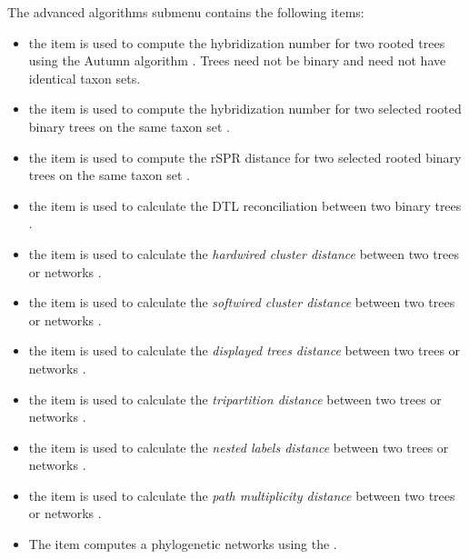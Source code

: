 \documentclass[11pt]{article}
\begin{document}
{\small
The advanced algorithms submenu contains the following items:
\begin{itemize}
\item the  item is used to compute the {hybridization number} for two rooted trees using the Autumn algorithm \cite{HusonLinz2012}. Trees need not be binary and need not have identical taxon
sets.
\item the  item is used to compute the {hybridization number} for two selected rooted binary trees on the same taxon set \cite{Albrecht2012}.
\item the  item  is used to compute the {rSPR distance} for two selected rooted binary trees on the same taxon set \cite{whiddenWABI}.
\item the  item  is used to calculate the {DTL reconciliation} between two binary trees \cite{Doyon10}.
\item the  item  is used to calculate the \emph{hardwired cluster distance} between two trees or networks \cite{PhylogeneticNetworks2010}.
\item the  item  is used to calculate the \emph{softwired cluster distance} between two trees or networks  \cite{PhylogeneticNetworks2010}.
\item the  item  is used to calculate the \emph{displayed trees distance} between two trees or networks \cite{PhylogeneticNetworks2010}.
\item the  item  is used to calculate the \emph{tripartition distance} between two trees or networks \cite{MNWRTPST2004}.
\item the  item  is used to calculate the \emph{nested labels distance} between two trees or networks \cite{CLRV2009d,Nakhleh2009}.
\item the  item  is used to calculate the \emph{path multiplicity distance} between two trees or networks \cite{CardonaTreeChildNetworks2008}.
\item The  item computes a phylogenetic networks using the  \cite{VanIersel2009}.
\end{itemize}
}
\end{document}
